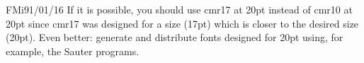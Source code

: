 \begin{comment}{TF}{91/01/02}
  When calling the driver after running PC\TeX\ you
  will find that the driver misses some fonts and uses
  substitutions which look quite strange.

  This cause depends that PC\TeX\ normally uses
  magnifications of 10pt-fonts for bigger sizes. To
  work around this error you can either generate the
  missing fonts with Metafont or make a personal copy
  and change of {\tt fontdef.ori} where the fonts are
  defined. \\[0.5em]
  Example: You are working with 11pt size, starting
  your \TeX -file with
\begin{verbatim}
  \documentstyle[11pt]{article}
\end{verbatim}
  and using the command \verb'\Huge'.
  Invoking the driver he will tell you
\begin{verbatim}
Font cmr17 -- magnification 3572 not
found, using nearest neighbour
cmr17 mag 1643 instead
\end{verbatim}
  Looking in your personal copy of {\tt fontdef.ori}
  you will find the sequence
\begin{verbatim}
  %% And here is your playground:
  %%
  \new@fontshape{cmr}{m}{n}{%
       <5>cmr5%
       <6>cmr6%
       <7>cmr7%
       <8>cmr8%
       <9>cmr9%
       <10>cmr10%
       <11>cmr10 at10.95pt%
       <12>cmr12%
       <14>cmr12 at14.4pt%
       <17>cmr17%
       <20>cmr17 at20.736pt%
       <25>cmr10 at24.8832pt%
       }{}
\end{verbatim}
  For getting the original PC\TeX\ magnifications
  defined in {\tt lfonts.tex} you have to change the
  lines containing the definition of the "wrong" font,
  for example
\begin{verbatim}
  <20>cmr17 at20.736pt%
\end{verbatim}
  in
\begin{verbatim}
  <20>cmr10 at20.736pt%
\end{verbatim}
  and re-ini\TeX\ your \LaTeX -formatfile - this time
  using your personal copy of {\tt fontdef.ori}.
  Afterwards the driver will run correctly.
\end{comment}
\begin{remark}{FMi}{91/01/16}
 If it is possible, you should use cmr17 at 20pt instead of cmr10 at
 20pt since cmr17 was designed for a size (17pt) which is
 closer to the desired size (20pt). Even better: generate and
 distribute fonts designed for 20pt using, for example,
 the Sauter programs.
\end{remark}


